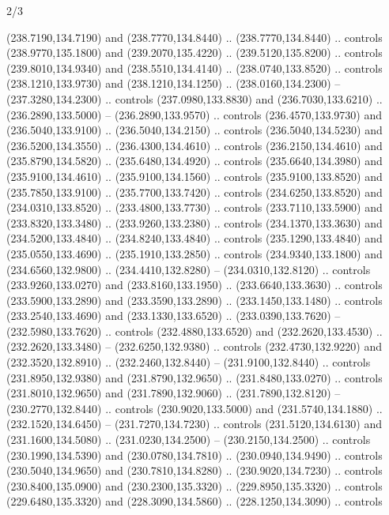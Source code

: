 \begin{flagdescription}{2/3}
\begin{scope}[xshift=0.5\flaglength,yshift=0.5\flagwidth,scale=\flagwidth/259.2]
\begin{scope}[y=0.8pt, x=0.8pt, yscale=-1,shift={(-243,-162)}]
      (238.7190,134.7190) and (238.7770,134.8440) .. (238.7770,134.8440) .. controls
      (238.9770,135.1800) and (239.2070,135.4220) .. (239.5120,135.8200) .. controls
      (239.8010,134.9340) and (238.5510,134.4140) .. (238.0740,133.8520) .. controls
      (238.1210,133.9730) and (238.1210,134.1250) .. (238.0160,134.2300) --
      (237.3280,134.2300) .. controls (237.0980,133.8830) and (236.7030,133.6210) ..
      (236.2890,133.5000) -- (236.2890,133.9570) .. controls (236.4570,133.9730) and
      (236.5040,133.9100) .. (236.5040,134.2150) .. controls (236.5040,134.5230) and
      (236.5200,134.3550) .. (236.4300,134.4610) .. controls (236.2150,134.4610) and
      (235.8790,134.5820) .. (235.6480,134.4920) .. controls (235.6640,134.3980) and
      (235.9100,134.4610) .. (235.9100,134.1560) .. controls (235.9100,133.8520) and
      (235.7850,133.9100) .. (235.7700,133.7420) .. controls (234.6250,133.8520) and
      (234.0310,133.8520) .. (233.4800,133.7730) .. controls (233.7110,133.5900) and
      (233.8320,133.3480) .. (233.9260,133.2380) .. controls (234.1370,133.3630) and
      (234.5200,133.4840) .. (234.8240,133.4840) .. controls (235.1290,133.4840) and
      (235.0550,133.4690) .. (235.1910,133.2850) .. controls (234.9340,133.1800) and
      (234.6560,132.9800) .. (234.4410,132.8280) -- (234.0310,132.8120) .. controls
      (233.9260,133.0270) and (233.8160,133.1950) .. (233.6640,133.3630) .. controls
      (233.5900,133.2890) and (233.3590,133.2890) .. (233.1450,133.1480) .. controls
      (233.2540,133.4690) and (233.1330,133.6520) .. (233.0390,133.7620) --
      (232.5980,133.7620) .. controls (232.4880,133.6520) and (232.2620,133.4530) ..
      (232.2620,133.3480) -- (232.6250,132.9380) .. controls (232.4730,132.9220) and
      (232.3520,132.8910) .. (232.2460,132.8440) -- (231.9100,132.8440) .. controls
      (231.8950,132.9380) and (231.8790,132.9650) .. (231.8480,133.0270) .. controls
      (231.8010,132.9650) and (231.7890,132.9060) .. (231.7890,132.8120) --
      (230.2770,132.8440) .. controls (230.9020,133.5000) and (231.5740,134.1880) ..
      (232.1520,134.6450) -- (231.7270,134.7230) .. controls (231.5120,134.6130) and
      (231.1600,134.5080) .. (231.0230,134.2500) -- (230.2150,134.2500) .. controls
      (230.1990,134.5390) and (230.0780,134.7810) .. (230.0940,134.9490) .. controls
      (230.5040,134.9650) and (230.7810,134.8280) .. (230.9020,134.7230) .. controls
      (230.8400,135.0900) and (230.2300,135.3320) .. (229.8950,135.3320) .. controls
      (229.6480,135.3320) and (228.3090,134.5860) .. (228.1250,134.3090) .. controls

\end{scope}
\end{scope}
\end{flagdescription}
